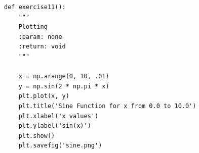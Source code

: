 \documentclass[10pt]{article}
\begin{document}
\begin{enumerate}
\begin{figure}
\end{figure}

\begin{verbatim}
def exercise11():
    """
    Plotting
    :param: none
    :return: void
    """

    x = np.arange(0, 10, .01)
    y = np.sin(2 * np.pi * x)
    plt.plot(x, y)
    plt.title('Sine Function for x from 0.0 to 10.0')
    plt.xlabel('x values')
    plt.ylabel('sin(x)')
    plt.show()
    plt.savefig('sine.png')
\end{verbatim}




\end{enumerate}
\end{document}
